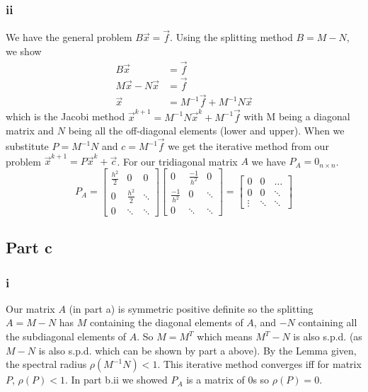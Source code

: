 \documentclass[12pt]{article}
\begin{document}
\subsubsection*{ii}
We have the general problem $B\vec{x} = \vec{f}$. Using the splitting method $B=M-N$, we show
\begin{equation}
\begin{split}
B\vec{x} &= \vec{f} \\
M\vec{x} - N\vec{x} &= \vec{f} \\
\vec{x} &= M^{-1}\vec{f} + M^{-1}N\vec{x}
\end{split}
\end{equation}
which is the Jacobi method $\vec{x}^{k+1} =  M^{-1}N\vec{x}^k + M^{-1}\vec{f}$ with M being a diagonal matrix and $N$ being all the off-diagonal elements (lower and upper). When we substitute $P = M^{-1}N$ and $c = M^{-1}\vec{f}$ we get the iterative method from our problem $\vec{x}^{k+1} = P\vec{x}^k + \vec{c}$. For our tridiagonal matrix $A$ we have $P_A = 0_{n \times n}$.
\begin{equation}
P_A = 
\begin{bmatrix}
\frac{h^2}{2} & 0 & 0\\
0 & \frac{h^2}{2} & \ddots \\
0 & \ddots & \ddots
\end{bmatrix}
\begin{bmatrix}
0 & \frac{-1}{h^2} & 0\\
\frac{-1}{h^2} & 0 & \ddots \\
0 & \ddots & \ddots
\end{bmatrix}
= 
\begin{bmatrix}
0 & 0 & \hdots \\
0 & 0 & \ddots \\
\vdots & \ddots & \ddots
\end{bmatrix}
\end{equation}

\subsection*{Part c}
\subsubsection*{i}
Our matrix $A$ (in part a) is symmetric positive definite so the splitting $A = M - N$ has $M$ containing the diagonal elements of $A$, and $-N$ containing all the subdiagonal elements of $A$. So $M=M^T$ which means $M^T-N$ is also s.p.d. (as $M-N$ is also s.p.d. which can be shown by part a above). By the Lemma given, the spectral radius $\rho(M^{-1}N) < 1$. This iterative method converges iff for matrix $P$, $\rho(P)<1$. In part b.ii we showed $P_A$ is a matrix of 0s so $\rho(P) = 0$.
\end{document}
